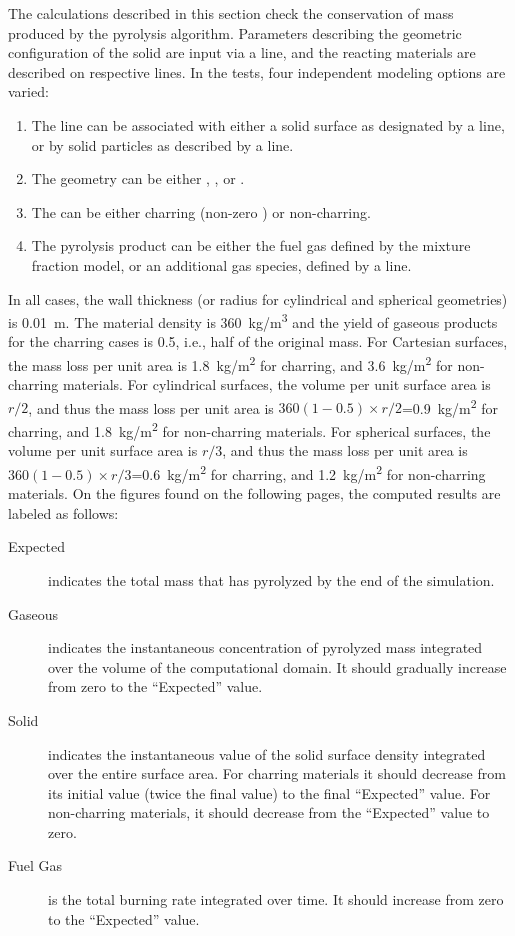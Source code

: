 \documentclass[11pt]{book}
\begin{document}
The calculations described in this section check the conservation of
mass produced by the pyrolysis algorithm. Parameters describing the geometric configuration of the solid are input via a  line,  and
the reacting materials are described on respective  lines. In the tests, four independent modeling options are varied:
\begin{enumerate}
\item The  line can be associated with either a solid surface as designated by a  line, or by solid particles as
described by a  line.
\item The  geometry can be either , , or .
\item The  can be either charring (non-zero ) or non-charring.
\item The pyrolysis product can be either the fuel gas defined by the
mixture fraction model, or an additional gas species, defined by a  line.
\end{enumerate}
In all cases, the wall thickness (or radius for cylindrical and spherical geometries) is 0.01~m. The material density is 360~\si{kg/m^3} and the yield of gaseous
products for the charring cases is 0.5, i.e., half of the original mass. For Cartesian surfaces, the mass loss per unit area is
1.8~\si{kg/m^2} for charring, and 3.6~\si{kg/m^2} for non-charring materials.
For cylindrical surfaces, the volume per unit surface area is $r/2$, and thus the mass loss per unit area
is $360(1-0.5) \times r/2$=0.9~\si{kg/m^2} for charring, and 1.8~\si{kg/m^2} for non-charring materials.
For spherical surfaces, the volume per unit surface area is $r/3$, and thus the mass loss per unit area is
$360(1-0.5) \times r/3$=0.6~\si{kg/m^2} for charring, and 1.2~\si{kg/m^2} for non-charring materials.
On the figures found on the following pages, the computed results are labeled as follows:
\begin{description}
\item[Expected] indicates the total mass that has pyrolyzed by the end of the simulation.
\item[Gaseous] indicates the instantaneous concentration of pyrolyzed mass integrated over the volume of the
computational domain. It should gradually increase from zero to the ``Expected'' value.
\item[Solid] indicates the instantaneous value of the solid surface density integrated over the entire surface area.
For charring materials it should decrease from its initial value (twice the final value) to the final ``Expected'' value. For non-charring materials, it should
decrease from the ``Expected'' value to zero.
\item[Fuel Gas] is the total burning rate integrated over time. It should increase from zero to the ``Expected'' value.
\end{description}
\end{document}
